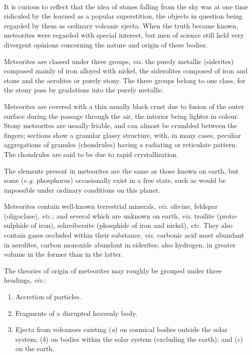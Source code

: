 \documentclass[a4paper, 12pt, oneside, landscape]{article}
\begin{document}
\paragraph{}
It is curious to reflect that the idea of stones falling from the sky was at one time ridiculed by the learned as a popular superstition, the objects in question being regarded by them as ordinary volcanic ejecta. When the truth became known, meteorites were regarded with special interest, but men of science still held very divergent opinions concerning the nature and origin of these bodies.

Meteorites are classed under three groups, \emph{viz.} the purely metallic (siderites) composed mainly of iron alloyed with nickel, the siderolites composed of iron and stone and the aerolites or purely stony. The three groups belong to one class, for the stony pass by gradations into the purely metallic.

Meteorites are covered with a thin usually black crust due to fusion of the outer surface during the passage through the air, the interior being lighter in colour. Stony meteorites are usually friable, and can almost be crumbled between the fingers; sections show a granular glassy structure, with, in many cases, peculiar aggregations of granules (chondrules) having a radiating or reticulate pattern. The chondrules are said to be due to rapid crystallization.

The elements present in meteorites are the same as those known on earth, but some (\emph{e.g.} phosphorus) occasionally exist in a free state, such as would be impossible under ordinary conditions on this planet.

Meteorites contain well-known terrestrial minerals, \emph{viz.} olivine, feldspar (oligoclase), \emph{etc.}; and several which are unknown on earth, \emph{viz.} troilite (proto-sulphide of iron), schreibersite (phosphide of iron and nickel), \emph{etc.} They also contain gases occluded within their substance, \emph{viz.} carbonic acid most abundant in aerolites, carbon monoxide abundant in siderites; also hydrogen, in greater volume in the former than in the latter.

The theories of origin of meteorites may roughly be grouped under three headings, \emph{viz.}:
\begin{enumerate}
    \item Accretion of particles.
    \item Fragments of a disrupted heavenly body.
    \item Ejecta from volcanoes existing (\emph{a}) on cosmical bodies outside the solar system; (\emph{b}) on bodies within the solar system (excluding the earth); and (\emph{c}) on the earth.
\end{enumerate}
\end{document}

